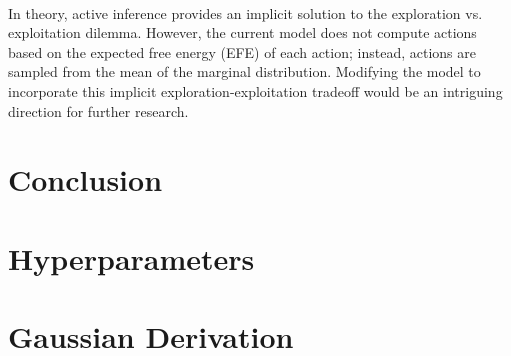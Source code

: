 \documentclass{article}
\begin{document}
\

In theory, active inference provides an implicit solution to the exploration vs. exploitation dilemma. However, the current model does not compute actions based on the expected free energy (EFE) of each action; instead, actions are sampled from the mean of the marginal distribution. Modifying the model to incorporate this implicit exploration-exploitation tradeoff would be an intriguing direction for further research.


\section{Conclusion}

\newpage



\newpage

\appendix

\section{Hyperparameters}\label{appendix:hyperparameters}

\section{Gaussian Derivation}\label{appendix:laplace_approx}
\end{document}
